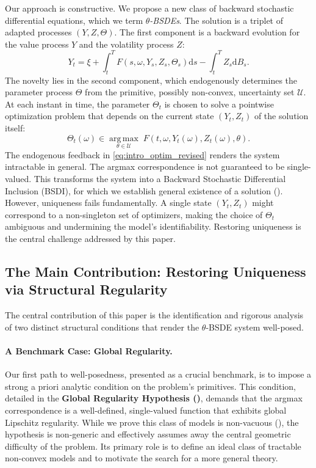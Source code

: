\documentclass[12pt, letterpaper]{amsart}
\newcommand{\Ucal}{\mathcal{U}}
\newcommand{\dd}{\mathrm{d}}
\DeclareMathOperator*{\argmax}{arg\,max}
\theoremstyle{plain}
\theoremstyle{definition}
\theoremstyle{remark}
\numberwithin{equation}{section} %
\begin{document}
Our approach is constructive. We propose a new class of backward stochastic differential equations, which we term \emph{$\theta$-BSDEs}. The solution is a triplet of adapted processes $(Y,Z,\Theta)$. The first component is a backward evolution for the value process $Y$ and the volatility process $Z$:
\begin{equation} \label{eq:intro_bsde_revised}
    Y_t = \xi + \int_t^T F(s, \omega, Y_s, Z_s, \Theta_s) \dd s - \int_t^T Z_s \dd B_s.
\end{equation}
The novelty lies in the second component, which endogenously determines the parameter process $\Theta$ from the primitive, possibly non-convex, uncertainty set $\Ucal$. At each instant in time, the parameter $\Theta_t$ is chosen to solve a pointwise optimization problem that depends on the current state $(Y_t, Z_t)$ of the solution itself:
\begin{equation} \label{eq:intro_optim_revised}
    \Theta_t(\omega) \in \underset{\theta \in \Ucal}{\argmax} \; F(t, \omega, Y_t(\omega), Z_t(\omega), \theta).
\end{equation}
The endogenous feedback in \eqref{eq:intro_optim_revised} renders the system intractable in general. The argmax correspondence is not guaranteed to be single-valued. This transforms the system into a Backward Stochastic Differential Inclusion (BSDI), for which we establish general existence of a solution (). However, uniqueness fails fundamentally. A single state $(Y_t, Z_t)$ might correspond to a non-singleton set of optimizers, making the choice of $\Theta_t$ ambiguous and undermining the model's identifiability. Restoring uniqueness is the central challenge addressed by this paper.

\subsection{The Main Contribution: Restoring Uniqueness via Structural Regularity}
The central contribution of this paper is the identification and rigorous analysis of two distinct structural conditions that render the $\theta$-BSDE system well-posed.

\paragraph{\textbf{A Benchmark Case: Global Regularity.}}
Our first path to well-posedness, presented as a crucial benchmark, is to impose a strong a priori analytic condition on the problem's primitives. This condition, detailed in the \textbf{Global Regularity Hypothesis ()}, demands that the argmax correspondence is a well-defined, single-valued function that exhibits global Lipschitz regularity. While we prove this class of models is non-vacuous (), the hypothesis is non-generic and effectively assumes away the central geometric difficulty of the problem. Its primary role is to define an ideal class of tractable non-convex models and to motivate the search for a more general theory.
\end{document}

